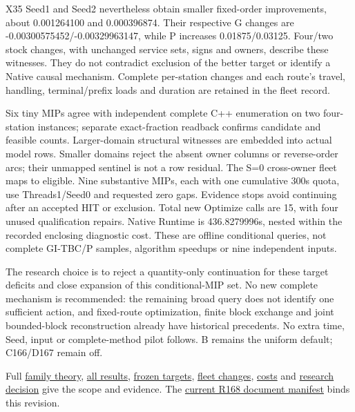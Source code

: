\documentclass[
  american,
  11pt,
]{article}
\begin{document}
X35 Seed1 and Seed2 nevertheless obtain smaller fixed-order
improvements, about 0.001264100 and 0.000396874. Their respective G
changes are -0.00300575452/-0.00329963147, while P increases
0.01875/0.03125. Four/two stock changes, with unchanged service sets,
signs and owners, describe these witnesses. They do not contradict
exclusion of the better target or identify a Native causal mechanism.
Complete per-station changes and each route's travel, handling,
terminal/prefix loads and duration are retained in the fleet record.

Six tiny MIPs agree with independent complete C++ enumeration on two
four-station instances; separate exact-fraction readback confirms
candidate and feasible counts. Larger-domain structural witnesses are
embedded into actual model rows. Smaller domains reject the absent owner
columns or reverse-order arcs; their unmapped sentinel is not a row
residual. The S=0 cross-owner fleet maps to eligible. Nine substantive
MIPs, each with one cumulative 300s quota, use Threads1/Seed0 and
requested zero gaps. Evidence stops avoid continuing after an accepted
HIT or exclusion. Total new Optimize calls are 15, with four unused
qualification repairs. Native Runtime is 436.8279996s, nested within the
recorded enclosing diagnostic cost. These are offline conditional
queries, not complete GI-TBC/P samples, algorithm speedups or nine
independent inputs.

The research choice is to reject a quantity-only continuation for these
target deficits and close expansion of this conditional-MIP set. No new
complete mechanism is recommended: the remaining broad query does not
identify one sufficient action, and fixed-route optimization, finite
block exchange and joint bounded-block reconstruction already have
historical precedents. No extra time, Seed, input or complete-method
pilot follows. B remains the uniform default; C166/D167 remain off.

Full
\href{https://github.com/yifanXovo/TailoredExact/blob/codex/round172-journal-manuscript/results/unified_exact_round168/route_family_theory.md}{family
theory},
\href{https://github.com/yifanXovo/TailoredExact/blob/codex/round172-journal-manuscript/results/unified_exact_round168/route_family_results.csv}{all
results},
\href{https://github.com/yifanXovo/TailoredExact/blob/codex/round172-journal-manuscript/results/unified_exact_round168/target_manifest.json}{frozen
targets},
\href{https://github.com/yifanXovo/TailoredExact/blob/codex/round172-journal-manuscript/results/unified_exact_round168/fleet_changes.json}{fleet
changes},
\href{https://github.com/yifanXovo/TailoredExact/blob/codex/round172-journal-manuscript/results/unified_exact_round168/cost_report.json}{costs}
and
\href{https://github.com/yifanXovo/TailoredExact/blob/codex/round172-journal-manuscript/results/unified_exact_round168/research_decision.md}{research
decision} give the scope and evidence. The
\href{https://github.com/yifanXovo/TailoredExact/blob/codex/round172-journal-manuscript/results/unified_exact_round168/source_manifest.json}{current
R168 document manifest} binds this revision.
\end{document}
